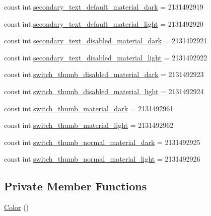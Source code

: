 \begin{CompactItemize}
\item 
const int \hyperlink{class__2doo_1_1_droid_1_1_resource_1_1_color_e13e6852c250576e4a5c5370cab97f12}{secondary\_\-text\_\-default\_\-material\_\-dark} = 2131492919
\item 
const int \hyperlink{class__2doo_1_1_droid_1_1_resource_1_1_color_bb54860573544e1043800973e02fcd7b}{secondary\_\-text\_\-default\_\-material\_\-light} = 2131492920
\item 
const int \hyperlink{class__2doo_1_1_droid_1_1_resource_1_1_color_8accd20dd0440dceb2a5a80aff35c1fd}{secondary\_\-text\_\-disabled\_\-material\_\-dark} = 2131492921
\item 
const int \hyperlink{class__2doo_1_1_droid_1_1_resource_1_1_color_307ee7527ee0fb58c51fee57853afe61}{secondary\_\-text\_\-disabled\_\-material\_\-light} = 2131492922
\item 
const int \hyperlink{class__2doo_1_1_droid_1_1_resource_1_1_color_6926e74ba54b7a0f73f4e592bb6dbf11}{switch\_\-thumb\_\-disabled\_\-material\_\-dark} = 2131492923
\item 
const int \hyperlink{class__2doo_1_1_droid_1_1_resource_1_1_color_4f627eba77bff08ea051108d7e03e7f2}{switch\_\-thumb\_\-disabled\_\-material\_\-light} = 2131492924
\item 
const int \hyperlink{class__2doo_1_1_droid_1_1_resource_1_1_color_ed68bde95e0b560c2eac63ec56ded08a}{switch\_\-thumb\_\-material\_\-dark} = 2131492961
\item 
const int \hyperlink{class__2doo_1_1_droid_1_1_resource_1_1_color_0d71930125652b68ae8c436e7522e58a}{switch\_\-thumb\_\-material\_\-light} = 2131492962
\item 
const int \hyperlink{class__2doo_1_1_droid_1_1_resource_1_1_color_5b7f43b8b37f66fd667d19118b24fd19}{switch\_\-thumb\_\-normal\_\-material\_\-dark} = 2131492925
\item 
const int \hyperlink{class__2doo_1_1_droid_1_1_resource_1_1_color_a85d7339bad58e47efd0f5a783d7c69a}{switch\_\-thumb\_\-normal\_\-material\_\-light} = 2131492926
\end{CompactItemize}
\subsection*{Private Member Functions}
\begin{CompactItemize}
\item 
\hyperlink{class__2doo_1_1_droid_1_1_resource_1_1_color_8a799c0372a5cf9c6da0d91d8fc0f35e}{Color} ()
\end{CompactItemize}
